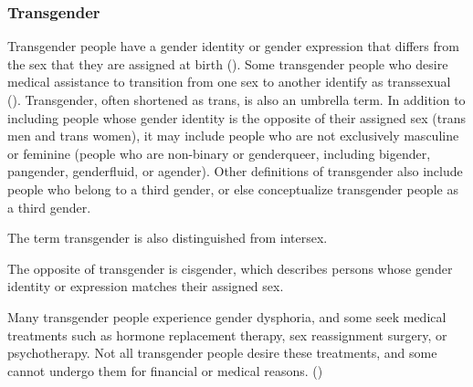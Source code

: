 \subsubsection{Transgender}
Transgender people have a gender identity or gender expression that differs from the sex that they are assigned at birth (\cite{altilio}). Some transgender people who desire medical assistance to transition from one sex to another identify as transsexual (\cite{polly}). Transgender, often shortened as trans, is also an umbrella term. In addition to including people whose gender identity is the opposite of their assigned sex (trans men and trans women), it may include people who are not exclusively masculine or feminine (people who are non-binary or genderqueer, including bigender, pangender, genderfluid, or agender). Other definitions of transgender also include people who belong to a third gender, or else conceptualize transgender people as a third gender.

The term transgender is also distinguished from intersex. 

The opposite of transgender is cisgender, which describes persons whose gender identity or expression matches their assigned sex.

Many transgender people experience gender dysphoria, and some seek medical treatments such as hormone replacement therapy, sex reassignment surgery, or psychotherapy. Not all transgender people desire these treatments, and some cannot undergo them for financial or medical reasons. (\cite{maizes})



